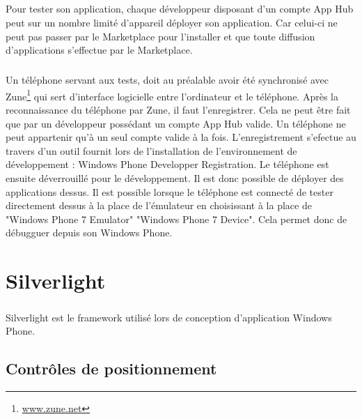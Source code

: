 \documentclass[twoside,UTF8]{EPURapport}
\begin{document}
\paragraph{}
Pour tester son application, chaque développeur disposant d'un compte App Hub peut sur un nombre limité d'appareil déployer son application. Car celui-ci ne peut pas passer par le Marketplace pour l'installer et que toute diffusion d'applications s'effectue par le Marketplace. 

\paragraph{}
Un téléphone servant aux tests, doit au préalable avoir été synchronisé avec Zune\footnote{\url{www.zune.net}} qui sert d'interface logicielle entre l'ordinateur et le téléphone. Après la reconnaissance du téléphone par Zune, il faut l'enregistrer. Cela ne peut être fait que par un développeur possédant un compte App Hub valide. Un téléphone ne peut appartenir qu'à un seul compte valide à la fois. L'enregistrement s'efectue au travers d'un outil fournit lors de l'installation de l'environnement de développement : Windows Phone Developper Registration. Le téléphone est ensuite déverrouillé  pour le développement. Il est donc possible de déployer des applications dessus. Il est possible lorsque le téléphone est connecté de tester directement dessus à la place de l'émulateur en choisissant à la place de "Windows Phone 7 Emulator" "Windows Phone 7 Device". Cela permet donc de débugguer depuis son Windows Phone.


\chapter{Silverlight}

\paragraph{}
Silverlight est le framework utilisé lors de conception d'application Windows Phone. 

	
	
	\section{Contrôles de positionnement}
\end{document}
